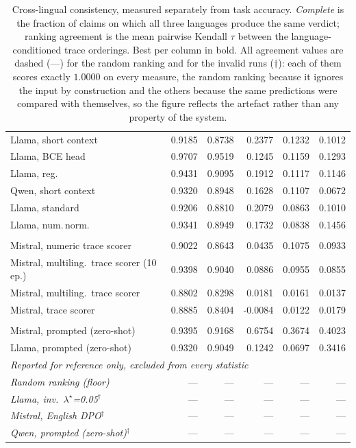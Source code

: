 \begin{table}[htbp]
\begin{tabular}{l rr rrr}
\quad Llama, short context & 0.9185 & 0.8738 & 0.2377 & 0.1232 & 0.1012 \\
\quad Llama, BCE head & 0.9707 & 0.9519 & 0.1245 & 0.1159 & 0.1293 \\
\quad Llama, reg. & 0.9431 & 0.9095 & 0.1912 & 0.1117 & 0.1146 \\
\quad Qwen, short context & 0.9320 & 0.8948 & 0.1628 & 0.1107 & 0.0672 \\
\quad Llama, standard & 0.9206 & 0.8810 & 0.2079 & 0.0863 & 0.1010 \\
\quad Llama, num.\,norm. & 0.9341 & 0.8949 & 0.1732 & 0.0838 & 0.1456 \\
\addlinespace[3pt]
\multicolumn{6}{l}{\itshape Earlier trace scorers}\\
\quad Mistral, numeric trace scorer & 0.9022 & 0.8643 & 0.0435 & 0.1075 & 0.0933 \\
\quad Mistral, multiling.\ trace scorer (10 ep.) & 0.9398 & 0.9040 & 0.0886 & 0.0955 & 0.0855 \\
\quad Mistral, multiling.\ trace scorer & 0.8802 & 0.8298 & 0.0181 & 0.0161 & 0.0137 \\
\quad Mistral, trace scorer & 0.8885 & 0.8404 & -0.0084 & 0.0122 & 0.0179 \\
\addlinespace[3pt]
\multicolumn{6}{l}{\itshape Prompted baselines}\\
\quad Mistral, prompted (zero-shot) & 0.9395 & 0.9168 & 0.6754 & 0.3674 & 0.4023 \\
\quad Llama, prompted (zero-shot) & 0.9320 & 0.9049 & 0.1242 & 0.0697 & 0.3416 \\
\midrule
\multicolumn{6}{l}{\itshape Reported for reference only, excluded from every statistic}\\
\quad \itshape Random ranking (floor) & --- & --- & --- & --- & --- \\
\quad \itshape Llama, inv.\ $\lambda^\star$=0.05$^{\dagger}$ & --- & --- & --- & --- & --- \\
\quad \itshape Mistral, English DPO$^{\dagger}$ & --- & --- & --- & --- & --- \\
\quad \itshape Qwen, prompted (zero-shot)$^{\dagger}$ & --- & --- & --- & --- & --- \\
\bottomrule
\end{tabular}
\caption{Cross-lingual consistency, measured separately from task accuracy. \emph{Complete} is the
fraction of claims on which all three languages produce the same verdict; ranking agreement is the
mean pairwise Kendall $\tau$ between the language-conditioned trace orderings. Best per column in
bold. All agreement values are dashed (---) for the random ranking and for the invalid runs
($\dagger$): each of them scores exactly $1.0000$ on every measure, the random ranking because it
ignores the input by construction and the others because the same predictions were compared with
themselves, so the figure reflects the artefact rather than any property of the system.}
\label{tab:results-consistency}
\end{table}
